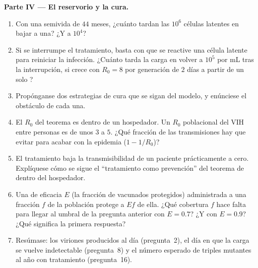 \begin{problem}
\medskip
\noindent\textbf{Parte IV --- El reservorio y la cura.}
\begin{enumerate}[resume]
  \item Con una semivida de $44$ meses, ¿cuánto tardan las $10^{6}$
        células latentes en bajar a una? ¿Y a $10^{4}$?
  \item Si se interrumpe el tratamiento, basta con que se reactive una
        célula latente para reiniciar la infección. ¿Cuánto tarda la
        carga en volver a $10^{5}$ por mL tras la interrupción, si crece
        con $R_{0} = 8$ por generación de $2$ días a partir de un solo
        ?
  \item Propónganse dos estrategias de cura que se sigan del modelo, y
        enúnciese el obstáculo de cada una.
  \item El $R_{0}$ del teorema es dentro de un hospedador. Un $R_{0}$
        poblacional del VIH entre personas es de unos $3$ a $5$. ¿Qué
        fracción de las transmisiones hay que evitar para acabar con la
        epidemia ($1 - 1/R_{0}$)?
  \item El tratamiento baja la transmisibilidad de un paciente
        prácticamente a cero. Explíquese cómo se sigue el ``tratamiento
        como prevención'' del teorema de dentro del hospedador.
  \item Una  de eficacia $E$ (la fracción de vacunados protegidos)
        administrada a una fracción $f$ de la población protege a $Ef$ de
        ella. ¿Qué cobertura $f$ hace falta para llegar al umbral de la
        pregunta anterior con $E = 0.7$? ¿Y con $E = 0.9$? ¿Qué
        significa la primera respuesta?
  \item Resúmase: los viriones producidos al día (pregunta~2), el día en
        que la carga se vuelve indetectable (pregunta~8) y el número
        esperado de triples mutantes al año con tratamiento
        (pregunta~16).
\end{enumerate}
\end{problem}
